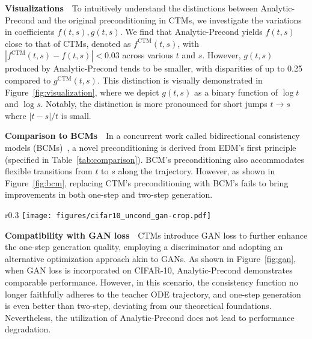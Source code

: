 \textbf{Visualizations}$\mbox{ }$ To intuitively understand the distinctions between Analytic-Precond and the original preconditioning in CTMs, we investigate the variations in coefficients $f(t,s),g(t,s)$. We find that Analytic-Precond yields $f(t,s)$ close to that of CTMs, denoted as $f^{\text{CTM}}(t,s)$, with $|f^{\text{CTM}}(t,s)-f(t,s)|<0.03$ across various $t$ and $s$. However, $g(t,s)$ produced by Analytic-Precond tends to be smaller, with disparities of up to 0.25 compared to $g^{\text{CTM}}(t,s)$. This distinction is visually demonstrated in Figure~\ref{fig:visualization}, where we depict $g(t,s)$ as a binary function of $\log t$ and $\log s$. Notably, the distinction is more pronounced for short jumps $t\rightarrow s$ where $|t-s|/t$ is small.

\textbf{Comparison to BCMs}$\mbox{ }$  In a concurrent work called bidirectional consistency models (BCMs)~\citep{li2024bidirectional}, a novel preconditioning is derived from EDM's first principle (specified in Table~\ref{tab:comparison}). BCM's preconditioning also accommodates flexible transitions from $t$ to $s$ along the trajectory. However, as shown in Figure~\ref{fig:bcm}, replacing CTM's preconditioning with BCM's fails to bring improvements in both one-step and two-step generation.

\begin{wrapfigure}[10]{r}{0.3\textwidth}
\vspace{-0.1in}
\texttt{[image: figures/cifar10\_uncond\_gan-crop.pdf]}
\caption{\label{fig:gan}\small{Effects of Analytic-Precond with GAN loss.}}
\end{wrapfigure}
\textbf{Compatibility with GAN loss}$\mbox{ }$ CTMs introduce GAN loss to further enhance the one-step generation quality, employing a discriminator and adopting an alternative optimization approach akin to GANs. As shown in Figure~\ref{fig:gan}, when GAN loss is incorporated on CIFAR-10, Analytic-Precond demonstrates comparable performance. However, in this scenario, the consistency function no longer faithfully adheres to the teacher ODE trajectory, and one-step generation is even better than two-step, deviating from our theoretical foundations. Nevertheless, the utilization of Analytic-Precond does not lead to performance degradation.

